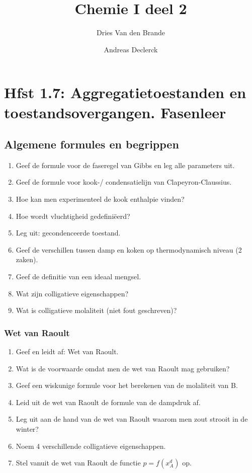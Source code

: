 \documentclass[12pt]{article}
\begin{document}
    \title{Chemie I deel 2}
    \author{Dries Van den Brande \and Andreas Declerck}

    \maketitle
    \section{Hfst 1.7: Aggregatietoestanden en toestandsovergangen. Fasenleer}

    \subsection{Algemene formules en begrippen}
    \begin{enumerate}
        \item Geef de formule voor de faseregel van Gibbs en leg alle parameters uit.
        \item Geef de formule voor kook-/ condensatielijn van Clapeyron-Claussius.
        \item Hoe kan men experimenteel de kook enthalpie vinden?
        \item Hoe wordt vluchtigheid gedefini\"eerd?
        \item Leg uit: gecondenceerde toestand.
        \item Geef de verschillen tussen damp en koken op thermodynamisch niveau (2 zaken).
        \item Geef de definitie van een ideaal mengsel.
        \item Wat zijn colligatieve eigenschappen?
        \item Wat is colligatieve molaliteit (niet fout geschreven)?
    \end{enumerate}

    \subsubsection{Wet van Raoult}
    \begin{enumerate}
        \item Geef en leidt af: Wet van Raoult.
        \item Wat is de voorwaarde omdat men de wet van Raoult mag gebruiken?
        \item Geef een wiskunige formule voor het berekenen van de molaliteit van B.
        \item Leid uit de wet van Raoult de formule van de dampdruk af.
        \item Leg uit aan de hand van de wet van Raoult waarom men zout strooit in de winter?
        \item Noem 4 verschillende colligatieve eigenschappen.
        \item Stel vanuit de wet van Raoult de functie $ p = f(x_A^d) $ op.
    \end{enumerate}
\end{document}
